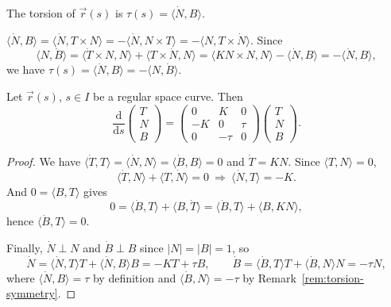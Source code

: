 \begin{definition}\label{def:torsion}
The torsion of $\vec r(s)$ is $\tau(s)=\langle\dot N,B\rangle$.
\end{definition}

\begin{remark}\label{rem:torsion-symmetry}
$\langle\dot N,B\rangle=\langle\dot N,T\times N\rangle=-\langle\dot N,N\times T\rangle=-\langle N,T\times\dot N\rangle$. Since
\[
  \langle N,\dot B\rangle
  =\langle\dot T\times N,N\rangle+\langle T\times\dot N,N\rangle
  =\langle KN\times N,N\rangle-\langle\dot N,B\rangle
  =-\langle\dot N,B\rangle,
\]
we have $\tau(s)=\langle\dot N,B\rangle=-\langle N,\dot B\rangle$.
\end{remark}

\begin{theorem}\label{thm:serret-frenet}
Let $\vec r(s)$, $s\in I$ be a regular space curve. Then
\[
  \frac{\mathrm d}{\mathrm ds}
  \begin{pmatrix}T\\N\\B\end{pmatrix}
  =\begin{pmatrix}0&K&0\\-K&0&\tau\\0&-\tau&0\end{pmatrix}
  \begin{pmatrix}T\\N\\B\end{pmatrix}.
\]
\end{theorem}

\begin{proof}
We have $\langle\dot T,T\rangle=\langle\dot N,N\rangle=\langle\dot B,B\rangle=0$ and $\dot T=KN$. Since $\langle T,N\rangle=0$,
\[
  \langle\dot T,N\rangle+\langle T,\dot N\rangle=0
  \ \Longrightarrow\
  \langle\dot N,T\rangle=-K.
\]
And $0=\langle B,T\rangle$ gives
\[
  0=\langle\dot B,T\rangle+\langle B,\dot T\rangle
  =\langle\dot B,T\rangle+\langle B,KN\rangle,
\]
hence $\langle\dot B,T\rangle=0$.

Finally, $\dot N\perp N$ and $\dot B\perp B$ since $|N|=|B|=1$, so
\[
  \dot N=\langle\dot N,T\rangle T+\langle\dot N,B\rangle B=-KT+\tau B,
  \qquad
  \dot B=\langle\dot B,T\rangle T+\langle\dot B,N\rangle N=-\tau N,
\]
where $\langle\dot N,B\rangle=\tau$ by definition and $\langle\dot B,N\rangle=-\tau$ by Remark~\ref{rem:torsion-symmetry}.
\end{proof}

